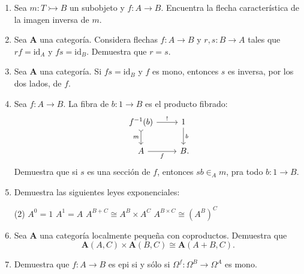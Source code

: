 \documentclass[11pt]{article}
\newcommand{\id}{\mathrm{id}}
\newcommand{\cat}[1]{\mathbf{#1}}
\begin{document}
\begin{enumerate}[\bf\text{Ej.} 1.]
    \item Sea \(m\colon T\rightarrowtail B\) un subobjeto y \(f\colon A\to B\).
    Encuentra la flecha característica de la imagen inversa de \(m\).

    \item Sea \(\cat{A}\) una categoría. Considera flechas \(f\colon A\to B\) y
    \(r,s\colon B\to A\) tales que \(rf=\id_A\) y \(fs=\id_B\). Demuestra que
    \(r=s\).

    \item Sea \(\cat{A}\) una categoría. Si \(fs=\id_B\) y \(f\) es mono,
    entonces \(s\) es inversa, por los dos lados, de \(f\).

    \item Sea \(f\colon A\to B\). La fibra de \(b\colon 1\to B\) es el producto fibrado:
    \begin{equation*}
      \begin{tikzcd}
        f^{-1}(b)\ar{r}{!}\ar[tail]{d}[swap]{m} & 1\ar{d}{b}\\
        A\ar{r}[swap]{f} & B\mathrlap{.}
      \end{tikzcd}
    \end{equation*}
    Demuestra que si \(s\) es una sección de \(f\), entonces \(sb\in_A m\), pra
    todo \(b\colon 1\to B\).

    \item Demuestra las siguientes leyes exponenciales:
  \begin{tasks}(2) \task \(A^0=1\) \task \(A^1=A\) \task \(A^{B+C}\cong
    A^B\times A^C\) \task \(A^{B\times C}\cong (A^B)^C\)
  \end{tasks}

  \item Sea \(\cat{A}\) una categoría localmente pequeña con coproductos. Demuestra que
  \begin{equation*}
    \cat{A}(A,C)\times\cat{A}(B,C)\cong\cat{A}(A+B,C).
  \end{equation*}

  \item Demuestra que \(f\colon A\to B\) es epi si y sólo si 
  \(\Omega^f\colon \Omega^B\to \Omega^A\) es mono.
    
  \end{enumerate}
\end{document}
